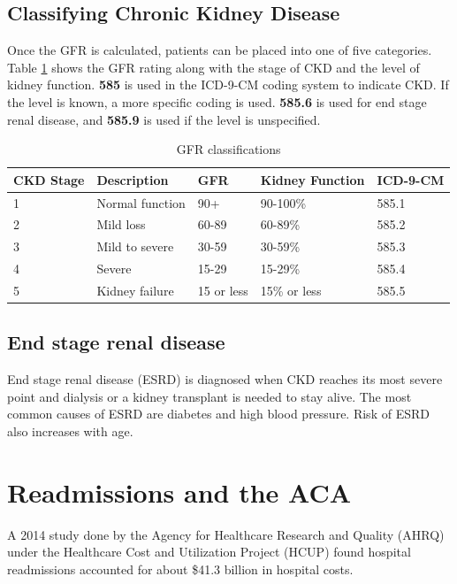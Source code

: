 \documentclass[12pt]{ociamthesis}\usepackage[]{graphicx}\usepackage[]{color}
\begin{document}
\subsection{Classifying Chronic Kidney Disease}

Once the GFR is calculated, patients can be placed into one of five categories. Table \ref{tab:gfr} shows the 
GFR rating along with the stage of CKD and the level of kidney function. \textbf{585} is used in the ICD-9-CM coding system
to indicate CKD. If the level is known, a more specific coding is used. \textbf{585.6} is used for end stage renal disease,
and \textbf{585.9} is used if the level is unspecified.

\begin{table}[]
\centering
\label{my-label}
\begin{tabular}{lllll}
CKD Stage & Description             & GFR        & Kidney Function & ICD-9-CM \\
\hline
1         & Normal function         & 90+        & 90-100\%        & 585.1    \\
2         & Mild loss               & 60-89      & 60-89\%         & 585.2    \\
3         & Mild to severe          & 30-59      & 30-59\%         & 585.3    \\
4         & Severe                  & 15-29      & 15-29\%         & 585.4    \\
5         & Kidney failure          & 15 or less & 15\% or less    & 585.5    \\
\end{tabular}\caption{GFR classifications}\label{tab:gfr}
\end{table}

\subsection{End stage renal disease}

End stage renal disease (ESRD) is diagnosed when CKD reaches its most severe point and dialysis or a kidney transplant is needed to stay alive.
The most common causes of ESRD are diabetes and high blood pressure. Risk of ESRD also increases with age.


\section{Readmissions and the ACA}

A 2014 study done by the Agency for Healthcare Research and Quality (AHRQ) under the Healthcare Cost and Utilization
Project (HCUP) found hospital readmissions accounted for about \$41.3 billion in hospital costs.  \cite{Hines2014}
\end{document}
